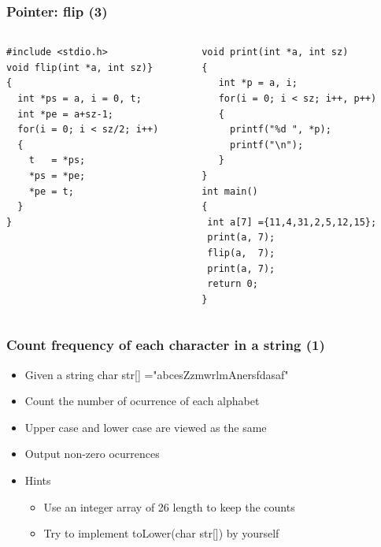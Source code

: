 \ifx\answers\undefined
\begin{frame}[fragile]
\frametitle{Pointer: flip (3)}
\vspace{-0.2in}
\begin{columns}
\begin{column}{0.460\linewidth}
\begin{lstlisting}[xleftmargin=0.03\linewidth]
#include <stdio.h>
void flip(int *a, int sz)}
{
  int *ps = a, i = 0, t;
  int *pe = a+sz-1;
  for(i = 0; i < sz/2; i++)
  {
    t   = *ps;
    *ps = *pe;
    *pe = t;
  }
}
\end{lstlisting}
\end{column}
\begin{column}{0.52\linewidth}
\begin{lstlisting}[xleftmargin=0.03\linewidth, firstnumber=13]
void print(int *a, int sz)
{
   int *p = a, i;
   for(i = 0; i < sz; i++, p++)
   {
     printf("%d ", *p);
     printf("\n");
   }
}
int main()
{
 int a[7] ={11,4,31,2,5,12,15};
 print(a, 7);
 flip(a,  7);
 print(a, 7);
 return 0;
}
\end{lstlisting}
\end{column}
\end{columns}
\end{frame}
\fi

\begin{frame}
\frametitle{Count frequency of each character in a string (1)}

\begin{itemize}
	\item {Given a string char str[] ="abcesZzmwrlmAnersfdasaf"}
	\item {Count the number of ocurrence of each alphabet}
	\item {Upper case and lower case are viewed as the same}
	\item {Output non-zero ocurrences}
	\item {Hints}
	\begin{itemize}
		\item {Use an integer array of 26 length to keep the counts}
		\item {Try to implement toLower(char str[]) by yourself}
	\end{itemize}
\end{itemize}
\end{frame}

